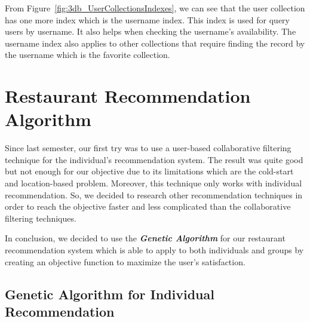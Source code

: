 \documentclass[12pt,oneside,openright,a4paper]{cpe-english-project}
\begin{document}
From Figure~\ref{fig:3db_UserCollectionsIndexes}, we can see that the user collection has one more index which is the username index. This index is used for query users by username. It also helps when checking the username’s availability. The username index also applies to other collections that require finding  the record by the username which is the favorite collection.


\section{Restaurant Recommendation Algorithm}

Since last semester, our first try was to use a user-based collaborative filtering technique for the individual’s recommendation system. The result was quite good but not enough for our objective due to its limitations which are the cold-start and location-based problem. Moreover, this technique only works with individual recommendation. So, we decided to research other recommendation techniques in order to reach the objective faster and less complicated than the collaborative filtering techniques.

In conclusion, we decided to use the \textit{\textbf{Genetic Algorithm}} for our restaurant recommendation system which is able to apply to both individuals and groups by creating an objective function to maximize the user’s satisfaction.

\newpage
\subsection{Genetic Algorithm for Individual Recommendation}
\end{document}
